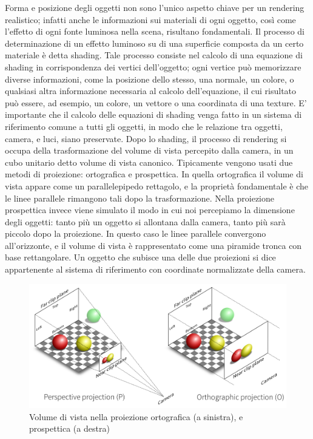 Forma e posizione degli oggetti non sono l’unico aspetto chiave per un rendering realistico; infatti anche le informazioni sui materiali di ogni oggetto, così come l’effetto di ogni fonte luminosa nella scena, risultano fondamentali. 
Il processo di determinazione di un effetto luminoso su di una superficie composta da un certo materiale è detta shading. Tale processo consiste nel calcolo di una equazione di shading in corrispondenza dei vertici dell’oggetto; ogni vertice può memorizzare diverse informazioni, come la posizione dello stesso, una normale, un colore, o qualsiasi altra informazione necessaria al calcolo dell’equazione, il cui risultato può essere, ad esempio, un colore, un vettore o una coordinata di una texture. E’ importante che il calcolo delle equazioni di shading venga fatto in un sistema di riferimento comune a tutti gli oggetti, in modo che le relazione tra oggetti, camera, e luci, siano preservate. 
Dopo lo shading, il processo di rendering si occupa della trasformazione del volume di vista percepito dalla camera, in un cubo unitario detto volume di vista canonico.
Tipicamente vengono usati due metodi di proiezione: ortografica e prospettica.
In quella ortografica il volume di vista appare come un parallelepipedo rettagolo, e la proprietà fondamentale è che le linee parallele rimangono tali dopo la trasformazione.
Nella proiezione prospettica invece viene simulato il modo in cui noi percepiamo la dimensione degli oggetti: tanto più un oggetto si allontana dalla camera, tanto più sarà piccolo dopo la proiezione. In questo caso le linee parallele convergono all’orizzonte, e il volume di vista è rappresentato come una piramide tronca con base rettangolare.
Un oggetto che subisce una delle due proiezioni  si dice appartenente al sistema di riferimento con coordinate normalizzate della camera. 
\\
\begin{figure}[htb]
 \centering
 \includegraphics[width=1.0\linewidth]{images/chapter_stato_arte/stato_arte_projections.png}\hfill
 \caption[Proiezione prospettica ed ortogonale]{Volume di vista nella proiezione ortografica (a sinistra), e prospettica (a destra)}
 \label{fig:stato_arte_trasfvista}
\end{figure}

